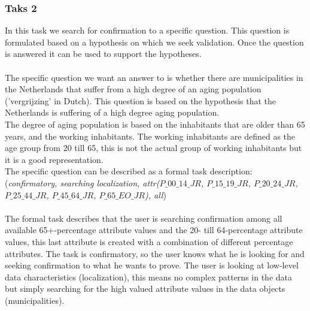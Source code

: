 \subsubsection{Taks 2}
In this task we search for confirmation to a specific question.
This question is formulated based on a hypothesis on which we seek validation.
Once the question is answered it can be used to support the hypotheses.\\
\\
The specific question we want an answer to is whether there are municipalities in the Netherlands that suffer from a high degree of an aging population ('vergrijzing' in Dutch).
This question is based on the hypothesis that the Netherlands is suffering of a high degree aging population.\\
The degree of aging population is based on the inhabitants that are older than 65 years, and the working inhabitants.
The working inhabitants are defined as the age group from 20 till 65, this is not the actual group of working inhabitants but it is a good representation.
\\
The specific question can be described as a formal task description:\\
(\textit{confirmatory, searching localization, attr($P\_00\_14\_JR$, $P\_15\_19\_JR$, $P\_20\_24\_JR$, $P\_25\_44\_JR$, $P\_45\_64\_JR$, $P\_65\_EO\_JR$), all})\\
\\
The formal task describes that the user is searching confirmation among all available 65+-percentage attribute values and the 20- till 64-percentage attribute values, this last attribute is created with a combination of different percentage attributes.
The task is confirmatory, so the user knows what he is looking for and seeking confirmation to what he wants to prove.
The user is looking at low-level data characteristics (localization), this means no complex patterns in the data but simply searching for the high valued attribute values in the data objects (municipalities).